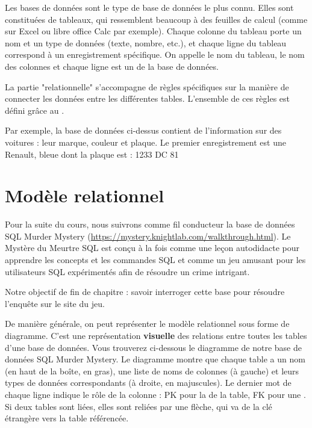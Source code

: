 Les bases de données  sont le type de base de données le plus connu. Elles sont constituées de tableaux,  qui ressemblent beaucoup à des feuilles de calcul (comme sur Excel ou libre office Calc par exemple). Chaque colonne du tableau porte un nom et un type de données (texte, nombre, etc.), et chaque ligne du tableau correspond à un enregistrement spécifique. On appelle  le nom du tableau,  le nom des colonnes et chaque ligne est un  de la base de données. 


La partie "relationnelle" s'accompagne de règles spécifiques sur la manière de connecter les données entre les différentes tables.
L'ensemble de ces règles est défini grâce au .

\begin{Comprendre}
    \begin{center}
        
    \end{center}
    Par exemple, la base de données ci-dessus contient de l'information sur des voitures : leur marque, couleur et plaque. Le premier enregistrement est une Renault, bleue dont la plaque est : 1233 DC 81
\end{Comprendre}

\section{Modèle relationnel}
Pour la suite du cours, nous suivrons comme fil conducteur la base de données SQL Murder Mystery (\url{https://mystery.knightlab.com/walkthrough.html}). 
Le Mystère du Meurtre SQL est conçu à la fois comme une leçon autodidacte pour apprendre les concepts et les commandes SQL et comme un jeu amusant pour les utilisateurs SQL expérimentés afin de résoudre un crime intrigant.\\

\begin{center}
    {\large Notre objectif de fin de chapitre : savoir interroger cette base pour résoudre l'enquête sur le site du jeu.}\\
\end{center}

De manière générale, on peut représenter le modèle relationnel sous forme de diagramme. C'est une représentation \textbf{visuelle} des relations entre toutes les tables d'une base de données. Vous trouverez ci-dessous le diagramme de notre base de données SQL Murder Mystery. Le diagramme montre que chaque table a un nom (en haut de la boîte, en gras), une liste de noms de colonnes (à gauche) et leurs types de données correspondants (à droite, en majuscules). Le dernier mot de chaque ligne indique le rôle de la colonne : PK pour la  de la table, FK pour une . Si deux tables sont liées, elles sont reliées par une flèche, qui va de la clé étrangère vers la table référencée.


